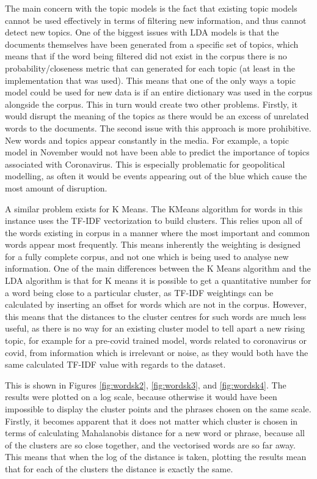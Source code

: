 The main concern with the topic models is the fact that existing topic models cannot be used effectively in terms of filtering new information, and thus cannot detect new topics. One of the biggest issues with LDA models is that the documents themselves have been generated from a specific set of topics, which means that if the word being filtered did not exist in the corpus there is no probability/closeness metric that can generated for each topic (at least in the implementation that was used). This means that one of the only ways a topic model could be used for new data is if an entire dictionary was used in the corpus alongside the corpus. This in turn would create two other problems. Firstly, it would disrupt the meaning of the topics as there would be an excess of unrelated words to the documents. The second issue with this approach is more prohibitive. New words and topics appear constantly in the media. For example, a topic model in November would not have been able to predict the importance of topics associated with Coronavirus. This is especially problematic for geopolitical modelling, as often it would be events appearing out of the blue which cause the most amount of disruption.  

A similar problem exists for K Means. The KMeans algorithm for words in this instance uses the TF-IDF vectorization to build clusters. This relies upon all of the words existing in corpus in a manner where the most important and common words appear most frequently. This means inherently the weighting is designed for a fully complete corpus, and not one which is being used to analyse new information. One of the main differences between the K Means algorithm and the LDA algorithm is that for K means it is possible to get a quantitative number for a word being close to a particular cluster, as TF-IDF weightings can be calculated by inserting an offset for words which are not in the corpus. However, this means that the distances to the cluster centres for such words are much less useful, as there is no way for an existing cluster model to tell apart a new rising topic, for example for a pre-covid trained model, words related to coronavirus or covid, from information which is irrelevant or noise, as they would both have the same calculated TF-IDF value with regards to the dataset.

This is shown in Figures \ref{fig:wordsk2}, \ref{fig:wordsk3}, and \ref{fig:wordsk4}. The results were plotted on a log scale, because otherwise it would have been impossible to display the cluster points and the phrases chosen on the same scale. Firstly, it becomes apparent that it does not matter which cluster is chosen in terms of calculating Mahalanobis distance for a new word or phrase, because all of the clusters are so close together, and the vectorised words are so far away. This means that when the log of the distance is taken, plotting the results mean that for each of the clusters the distance is exactly the same. 

